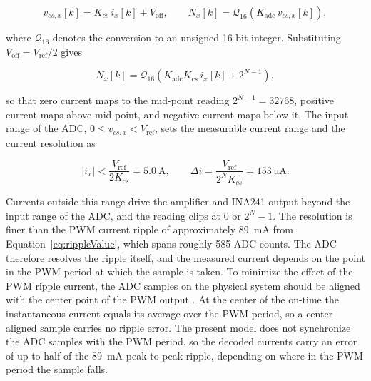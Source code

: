 \begin{equation}
	v_{cs,x}[k] = K_{cs}\, i_x[k] + V_{\mathrm{off}},
	\qquad
	N_x[k] = \mathcal{Q}_{16}\!\left( K_{\mathrm{adc}}\, v_{cs,x}[k] \right),
	\label{eq:adc_code}
\end{equation}

where $\mathcal{Q}_{16}$ denotes the conversion to an unsigned 16-bit integer. Substituting $V_{\mathrm{off}} = V_{\mathrm{ref}}/2$ gives

\begin{equation}
	N_x[k] = \mathcal{Q}_{16}\!\left( K_{\mathrm{adc}} K_{cs}\, i_x[k]
	+ 2^{N-1} \right),
	\label{eq:adc_combined}
\end{equation}

so that zero current maps to the mid-point reading $2^{N-1} = 32768$,
positive current maps above mid-point, and negative current maps below it. The input range of the ADC, $0 \le v_{cs,x} < V_{\mathrm{ref}}$, sets the measurable current range and the current resolution as

\begin{equation}
	\left| i_x \right| < \frac{V_{\mathrm{ref}}}{2 K_{cs}} = \SI{5.0}{\ampere},
	\qquad
	\Delta i = \frac{V_{\mathrm{ref}}}{2^{N} K_{cs}} = \SI{153}{\micro\ampere}.
	\label{eq:adc_range}
\end{equation}

Currents outside this range drive the amplifier and INA241 output beyond the input range of the ADC, and the reading clips at 0 or $2^{N}-1$. The resolution is finer than the PWM current ripple of approximately \SI{89}{\milli\ampere} from Equation~\eqref{eq:rippleValue}, which spans roughly 585 ADC counts. The ADC therefore resolves the ripple itself, and the measured current depends on the point in the PWM period at which the sample is taken.  To minimize the effect of the PWM ripple current, the ADC samples on the physical system should be aligned with the center point of the PWM output \cite{blasko_sampling_1998}. At the center of the on-time the instantaneous current equals its average over the PWM period, so a center-aligned sample carries no ripple error. The present model does not synchronize the ADC samples with the PWM period, so the decoded currents carry an error of up to half of the \SI{89}{\milli\ampere} peak-to-peak ripple, depending on where in the PWM period the sample falls.

